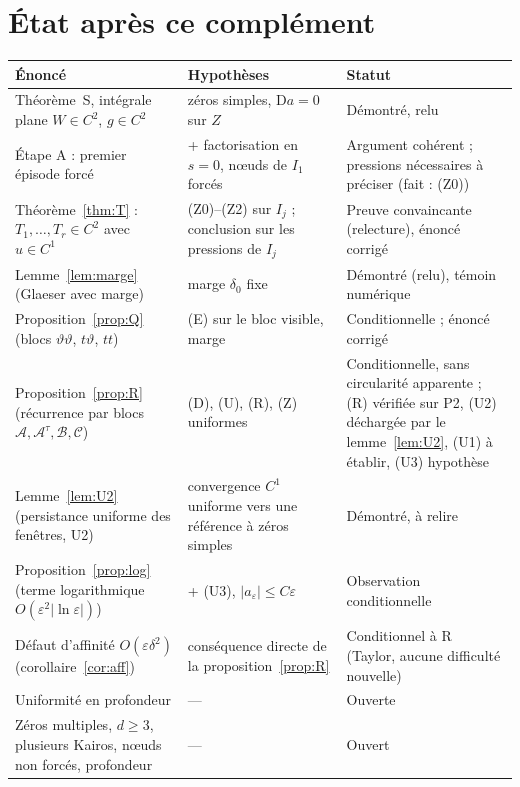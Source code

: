 \documentclass[11pt,a4paper]{article}
\theoremstyle{remark}
\newcommand{\vth}{\vartheta}
\newcommand{\D}{\mathrm D}
\begin{document}
\section{État après ce complément}
\begin{center}\small
\begin{tabular}{p{6.3cm}p{4.2cm}p{3.6cm}}
\toprule
Énoncé & Hypothèses & Statut\\\midrule
Théorème~S, intégrale plane $W\in C^2$, $g\in C^2$ & zéros simples, $\D a=0$ sur $Z$ & Démontré, relu\\
Étape A : premier épisode forcé & + factorisation en $s=0$, nœuds de $I_1$ forcés & Argument cohérent ; pressions nécessaires à préciser (fait : (Z0))\\
Théorème~\ref{thm:T} : $T_1,\dots,T_r\in C^2$ avec $u\in C^1$ & (Z0)--(Z2) sur $I_j$ ; conclusion sur les pressions de $I_j$ & Preuve convaincante (relecture), énoncé corrigé\\
Lemme~\ref{lem:marge} (Glaeser avec marge) & marge $\delta_0$ fixe & Démontré (relu), témoin numérique\\
Proposition~\ref{prop:Q} (blocs $\vth\vth$, $t\vth$, $tt$) & (E) sur le bloc visible, marge & Conditionnelle ; énoncé corrigé\\
Proposition~\ref{prop:R} (récurrence par blocs $\mathcal A,\mathcal A^\tau,\mathcal B,\mathcal C$) & (D), (U), (R), (Z) uniformes & Conditionnelle, sans circularité apparente ; (R) vérifiée sur P2, (U2) déchargée par le lemme~\ref{lem:U2}, (U1) à établir, (U3) hypothèse\\
Lemme~\ref{lem:U2} (persistance uniforme des fenêtres, U2) & convergence $C^1$ uniforme vers une référence à zéros simples & Démontré, à relire\\
Proposition~\ref{prop:log} (terme logarithmique $O(\varepsilon^2|\ln\varepsilon|)$) & + (U3), $\lvert a_\varepsilon\rvert\le C\varepsilon$ & Observation conditionnelle\\
Défaut d'affinité $O(\varepsilon\delta^2)$ (corollaire~\ref{cor:aff}) & conséquence directe de la proposition~\ref{prop:R} & Conditionnel à R (Taylor, aucune difficulté nouvelle)\\
Uniformité en profondeur & --- & Ouverte\\
Zéros multiples, $d\ge3$, plusieurs Kairos, nœuds non forcés, profondeur & --- & Ouvert\\\bottomrule
\end{tabular}
\end{center}
\end{document}
